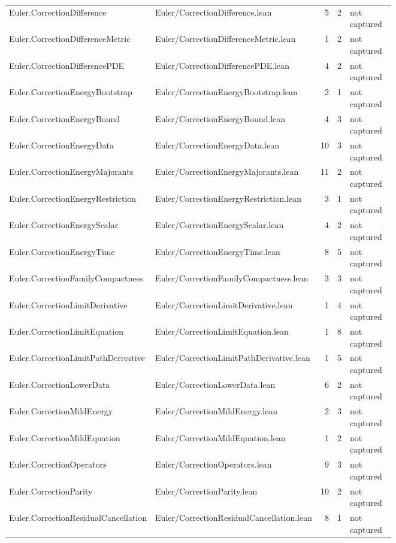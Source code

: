 \documentclass[10pt]{article}
\begin{document}
\begin{longtable}{p{0.28\linewidth}p{0.27\linewidth}r r p{0.20\linewidth}}
Euler.CorrectionDifference & Euler/CorrectionDifference.lean & 5 & 2 & not captured\\
Euler.CorrectionDifferenceMetric & Euler/CorrectionDifferenceMetric.lean & 1 & 2 & not captured\\
Euler.CorrectionDifferencePDE & Euler/CorrectionDifferencePDE.lean & 4 & 2 & not captured\\
Euler.CorrectionEnergyBootstrap & Euler/CorrectionEnergyBootstrap.lean & 2 & 1 & not captured\\
Euler.CorrectionEnergyBound & Euler/CorrectionEnergyBound.lean & 4 & 3 & not captured\\
Euler.CorrectionEnergyData & Euler/CorrectionEnergyData.lean & 10 & 3 & not captured\\
Euler.CorrectionEnergyMajorants & Euler/CorrectionEnergyMajorants.lean & 11 & 2 & not captured\\
Euler.CorrectionEnergyRestriction & Euler/CorrectionEnergyRestriction.lean & 3 & 1 & not captured\\
Euler.CorrectionEnergyScalar & Euler/CorrectionEnergyScalar.lean & 4 & 2 & not captured\\
Euler.CorrectionEnergyTime & Euler/CorrectionEnergyTime.lean & 8 & 5 & not captured\\
Euler.CorrectionFamilyCompactness & Euler/CorrectionFamilyCompactness.lean & 3 & 3 & not captured\\
Euler.CorrectionLimitDerivative & Euler/CorrectionLimitDerivative.lean & 1 & 4 & not captured\\
Euler.CorrectionLimitEquation & Euler/CorrectionLimitEquation.lean & 1 & 8 & not captured\\
Euler.CorrectionLimitPathDerivative & Euler/CorrectionLimitPathDerivative.lean & 1 & 5 & not captured\\
Euler.CorrectionLowerData & Euler/CorrectionLowerData.lean & 6 & 2 & not captured\\
Euler.CorrectionMildEnergy & Euler/CorrectionMildEnergy.lean & 2 & 3 & not captured\\
Euler.CorrectionMildEquation & Euler/CorrectionMildEquation.lean & 1 & 2 & not captured\\
Euler.CorrectionOperators & Euler/CorrectionOperators.lean & 9 & 3 & not captured\\
Euler.CorrectionParity & Euler/CorrectionParity.lean & 10 & 2 & not captured\\
Euler.CorrectionResidualCancellation & Euler/CorrectionResidualCancellation.lean & 8 & 1 & not captured\\

\end{longtable}
\end{document}
